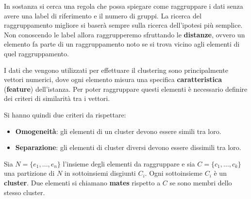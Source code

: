 In sostanza si cerca una regola che possa spiegare come raggruppare i dati senza
avere una label di riferimento e il numero di gruppi. La ricerca del raggruppamento
migliore si baserà sempre sulla ricerca dell'ipotesi più semplice. Non conoscendo
le label allora raggrupperemo sfruttando le \textbf{distanze}, ovvero un elemento
fa parte di un raggruppamento noto se si trova vicino agli elementi di quel
raggruppamento.

I dati che vengono utilizzati per effettuare il clustering sono principalmente
vettori numerici, dove ogni elemento misura una specifica \textbf{caratteristica}
(\textbf{feature}) dell'istanza. Per poter raggruppare questi elementi è necessario
definire dei criteri di similarità tra i vettori.

Si hanno quindi due criteri da rispettare:
\begin{itemize}
      \item \textbf{Omogeneità}: gli elementi di un cluster devono essere simili
            tra loro.
      \item \textbf{Separazione}: gli elementi di cluster diversi devono essere
            dissimili tra loro.
\end{itemize}
\begin{definizione}
      Sia $N = \{e_1, \dots, e_n\}$ l'insieme degli elementi da raggruppare e sia
      $C = \{c_1, \dots, c_k\}$ una partizione di $N$ in sottoinsiemi disgiunti
      $C_i$. Ogni sottoinsieme $C_i$ è un \textbf{cluster}. Due elementi si
      chiamano \textbf{mates} rispetto a $C$ se sono membri dello stesso cluster.
\end{definizione}

